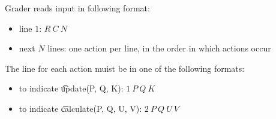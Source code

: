 Grader reads input in following format:
\begin{itemize}
\item line $1$: $R\ C\ N$
\item next $N$ lines: one action per line, in the order in which actions occur
\end{itemize}
The line for each action muist be in one of the following formats:
\begin{itemize}
\item to indicate \t{update(P, Q, K)}: $1\ P\ Q\ K$
\item to indicate \t{calculate(P, Q, U, V)}: $2\ P\ Q\ U\ V$
\end{itemize}
